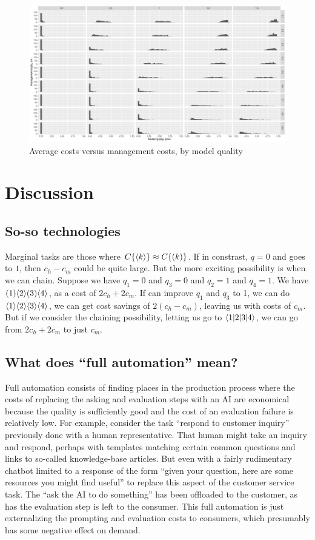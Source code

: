 \documentclass{article}
\begin{document}
\begin{figure}
\caption{Average costs versus management costs, by model quality} \label{fig:fraction_of_tasks_done_by_human}
\includegraphics[width = \textwidth]{plots/fraction_of_tasks_done_by_human.pdf}
\end{figure}


\section{Discussion}

\subsection{So-so technologies}
Marginal tasks are those where $C\{ \langle k \rangle \} \approx C\{ ( k ) \}$.
If in constrast, $q = 0$ and goes to $1$, then $c_h - c_m$ could be quite large.
But the more exciting possibility is when we can chain.
Suppose we have $q_1 = 0$ and $q_3 = 0$ and $q_2 = 1$ and $q_4 = 1$.
We have $( 1 )\langle 2 \rangle( 3 )\langle 4 \rangle$, as a cost of $2c_h + 2c_m$.
If can improve $q_1$ and $q_3$ to 1, we can do $\langle 1 \rangle\langle 2 \rangle\langle 3 \rangle\langle 4 \rangle$,  we can get cost savings of $2 (c_h - c_m)$, leaving us with costs of $c_m$.
But if we consider the chaining possibility, letting us go to $\langle 1|2|3|4 \rangle $, we can go from $2c_h + 2c_m$ to just $c_m$. 

\subsection{What does ``full automation'' mean?}
Full automation consists of finding places in the production process where the costs of replacing the asking and evaluation steps with an AI are economical because the quality is sufficiently good and the cost of an evaluation failure is relatively low. 
For example, consider the task ``respond to customer inquiry'' previously done with a human representative. 
That human might take an inquiry and respond, perhaps with templates matching certain common questions and links to so-called knowledge-base articles. 
But even with a fairly rudimentary chatbot limited to a response of the form ``given your question, here are some resources you might find useful'' to replace this aspect of the customer service task.
The ``ask the AI to do something'' has been offloaded to the customer, as has the evaluation step is left to the consumer.
This full automation is just externalizing the prompting and evaluation costs to consumers, which presumably has some negative effect on demand.  
\end{document}
